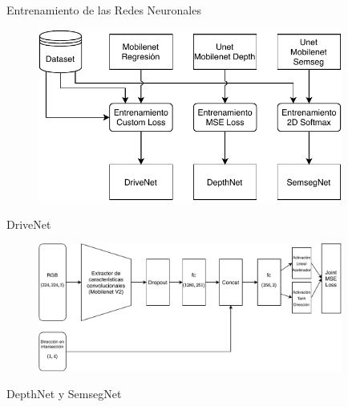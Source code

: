 \documentclass[10pt, usepdftitle=false]{beamer}
\begin{document}
%
\begin{frame}[fragile]{Entrenamiento de las Redes Neuronales}
	\begin{figure}[H]
		\captionsetup{labelformat=empty}
		\centering
		\includegraphics[width=10cm]{imagenes/arquitectura_entrenamiento}
	\end{figure}
\end{frame}
%
\begin{frame}[fragile]{DriveNet}
	\begin{figure}[H]
		\captionsetup{labelformat=empty}
		\centering
		\includegraphics[width=10cm]{imagenes/drivenet}
	\end{figure}
\end{frame}

\begin{frame}[fragile]{DepthNet y SemsegNet}
	\begin{figure}[H]
		\captionsetup[subfloat]{labelformat=empty}
		\centering
		\hspace{2mm}
	\end{figure}
\end{frame}
\end{document}
